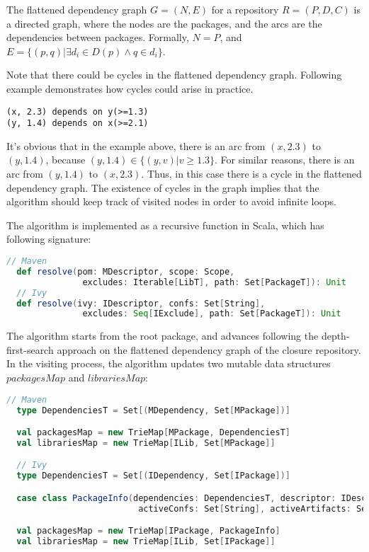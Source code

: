 \begin{definition}
  The flattened dependency graph $G = (N, E)$ for a repository $R = (P, D, C)$ is a directed graph, where the nodes are the packages, and the arcs are the dependencies between packages. Formally, $N = P$, and $E = \{ (p, q) | \exists d_i \in D(p) \land q \in d_i\}$.
\end{definition}

Note that there could be cycles in the flattened dependency graph. Following example demonstrates how cycles could arise in practice.

\begin{verbatim}
(x, 2.3) depends on y(>=1.3)
(y, 1.4) depends on x(>=2.1)
\end{verbatim}

It's obvious that in the example above, there is an arc from $(x, 2.3)$ to $(y, 1.4)$, because $(y, 1.4) \in \{(y, v) | v \geq 1.3 \}$. For similar reasons, there is an arc from $(y, 1.4)$ to $(x, 2.3)$. Thus, in this case there is a cycle in the flattened dependency graph. The existence of cycles in the graph implies that the algorithm should keep track of visited nodes in order to avoid infinite loops.

The algorithm is implemented as a recursive function in Scala, which has following signature:
\begin{lstlisting}[language=Scala]
  // Maven
  def resolve(pom: MDescriptor, scope: Scope,
               excludes: Iterable[LibT], path: Set[PackageT]): Unit
  // Ivy
  def resolve(ivy: IDescriptor, confs: Set[String],
               excludes: Seq[IExclude], path: Set[PackageT]): Unit
\end{lstlisting}

The algorithm starts from the root package, and advances following the depth-first-search approach on the flattened dependency graph of the closure repository. In the visiting process, the algorithm updates two mutable data structures $packagesMap$ and $librariesMap$:

\begin{lstlisting}[language=Scala]
  // Maven
  type DependenciesT = Set[(MDependency, Set[MPackage])]

  val packagesMap = new TrieMap[MPackage, DependenciesT]
  val librariesMap = new TrieMap[ILib, Set[MPackage]]

  // Ivy
  type DependenciesT = Set[(IDependency, Set[IPackage])]

  case class PackageInfo(dependencies: DependenciesT, descriptor: IDescriptor,
                          activeConfs: Set[String], activeArtifacts: Set[String])

  val packagesMap = new TrieMap[IPackage, PackageInfo]
  val librariesMap = new TrieMap[ILib, Set[IPackage]]
\end{lstlisting}

